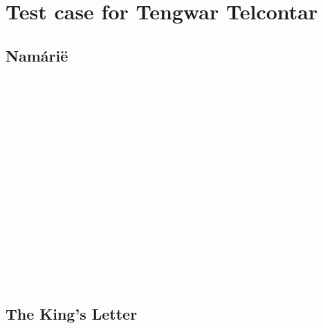 \documentclass[11pt,a4paper]{article}
\begin{document}
\section*{Test case for Tengwar Telcontar}

\subsection*{Namárië}
\tengtelcq
{\rcap }       \\
        \\
     \\
 {\rcap }      \\
  

       \\
  {\rcap  }    \\
{\rcap }      \\
     \\
        \\
    {\rcap }  {\rcap }

{\rcap }   {\rcap }

   {\rcap } 

\subsection*{The King’s Letter}
\begin{center}
\tengtelcb
{\bcap  }  \\
   \\
  {\bcap } \\
     \\
    \\
     \\
    {\bcap } \\
       \\
    \\
    \\
  {\bcap }  \\
   ‍ 
\end{center}
\end{document}
